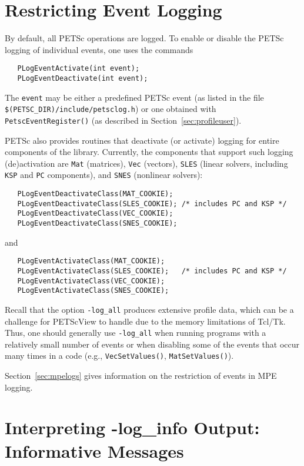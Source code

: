 \section{Restricting Event Logging}
\label{sec:deactivate}

By default, all PETSc operations are logged.
To enable or disable the PETSc logging of individual events, one uses the commands
\begin{verbatim}
   PLogEventActivate(int event);
   PLogEventDeactivate(int event);
\end{verbatim}
The {\tt event} may be either a predefined PETSc event (as listed in
the file {\tt \$(PETSC\_DIR)/include/petsclog.h}) or one obtained with
{\tt PetscEventRegister()} (as described in Section~\ref{sec:profileuser}).

PETSc also provides routines that deactivate (or activate)
logging for entire components of the library. Currently, the 
components that support such logging (de)activation are {\tt Mat} (matrices),
{\tt Vec} (vectors), {\tt SLES} (linear solvers, including {\tt KSP} 
and {\tt PC} components), and {\tt SNES} (nonlinear solvers):
\begin{verbatim}
   PLogEventDeactivateClass(MAT_COOKIE);
   PLogEventDeactivateClass(SLES_COOKIE); /* includes PC and KSP */
   PLogEventDeactivateClass(VEC_COOKIE);
   PLogEventDeactivateClass(SNES_COOKIE);
\end{verbatim}
and 
\begin{verbatim}
   PLogEventActivateClass(MAT_COOKIE);
   PLogEventActivateClass(SLES_COOKIE);   /* includes PC and KSP */
   PLogEventActivateClass(VEC_COOKIE);
   PLogEventActivateClass(SNES_COOKIE);
\end{verbatim}

Recall that the option {\tt -log\_all} produces extensive profile
data, which can be a challenge for PETScView to handle due to
the memory limitations of Tcl/Tk.  Thus, one should generally use
{\tt -log\_all} when running programs with a relatively small
number of events or when disabling some of the events that occur many
times in a code (e.g., {\tt VecSetValues()}, {\tt MatSetValues()}).

Section~\ref{sec:mpelogs} gives information on the restriction of events
in MPE logging.


\section{Interpreting -log\_info Output: Informative Messages}
\label{sec:ploginfo}

